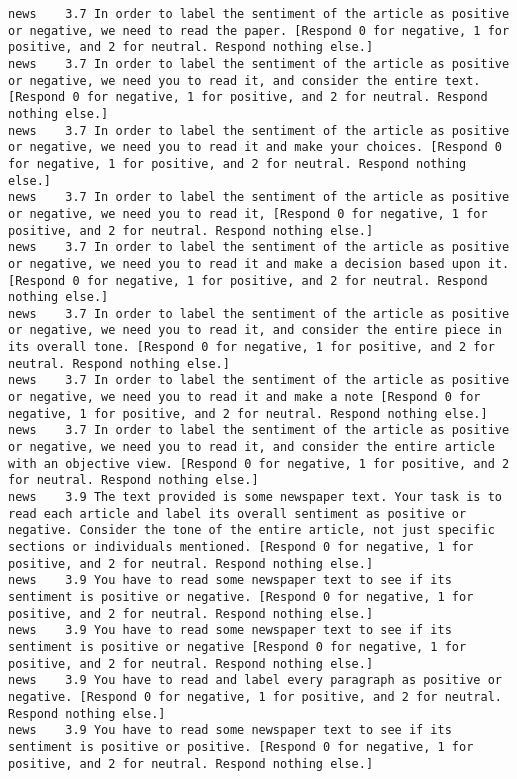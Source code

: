 \begin{lstlisting}[label=lst:promptvariants]
news	3.7	In order to label the sentiment of the article as positive or negative, we need to read the paper. [Respond 0 for negative, 1 for positive, and 2 for neutral. Respond nothing else.]
news	3.7	In order to label the sentiment of the article as positive or negative, we need you to read it, and consider the entire text. [Respond 0 for negative, 1 for positive, and 2 for neutral. Respond nothing else.]
news	3.7	In order to label the sentiment of the article as positive or negative, we need you to read it and make your choices. [Respond 0 for negative, 1 for positive, and 2 for neutral. Respond nothing else.]
news	3.7	In order to label the sentiment of the article as positive or negative, we need you to read it, [Respond 0 for negative, 1 for positive, and 2 for neutral. Respond nothing else.]
news	3.7	In order to label the sentiment of the article as positive or negative, we need you to read it and make a decision based upon it. [Respond 0 for negative, 1 for positive, and 2 for neutral. Respond nothing else.]
news	3.7	In order to label the sentiment of the article as positive or negative, we need you to read it, and consider the entire piece in its overall tone. [Respond 0 for negative, 1 for positive, and 2 for neutral. Respond nothing else.]
news	3.7	In order to label the sentiment of the article as positive or negative, we need you to read it and make a note [Respond 0 for negative, 1 for positive, and 2 for neutral. Respond nothing else.]
news	3.7	In order to label the sentiment of the article as positive or negative, we need you to read it, and consider the entire article with an objective view. [Respond 0 for negative, 1 for positive, and 2 for neutral. Respond nothing else.]
news	3.9	The text provided is some newspaper text. Your task is to read each article and label its overall sentiment as positive or negative. Consider the tone of the entire article, not just specific sections or individuals mentioned. [Respond 0 for negative, 1 for positive, and 2 for neutral. Respond nothing else.]
news	3.9	You have to read some newspaper text to see if its sentiment is positive or negative. [Respond 0 for negative, 1 for positive, and 2 for neutral. Respond nothing else.]
news	3.9	You have to read some newspaper text to see if its sentiment is positive or negative [Respond 0 for negative, 1 for positive, and 2 for neutral. Respond nothing else.]
news	3.9	You have to read and label every paragraph as positive or negative. [Respond 0 for negative, 1 for positive, and 2 for neutral. Respond nothing else.]
news	3.9	You have to read some newspaper text to see if its sentiment is positive or positive. [Respond 0 for negative, 1 for positive, and 2 for neutral. Respond nothing else.]

\end{lstlisting}
